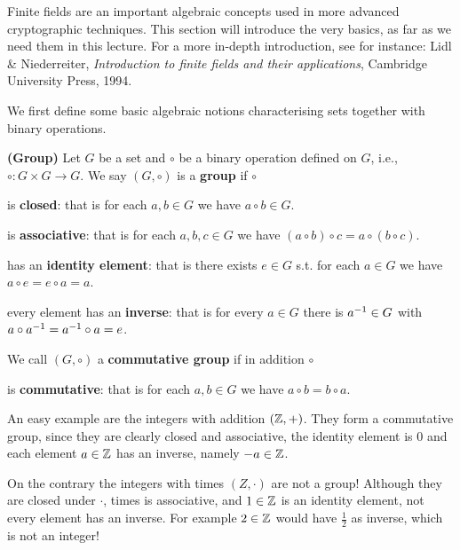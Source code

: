 \ifMaths{}

Finite fields are an important algebraic concepts used in more advanced
cryptographic techniques. This section will introduce the very basics, as far as
we need them in this lecture. For a more in-depth introduction, see for instance:
Lidl \& Niederreiter, \emph{Introduction to finite fields and their
  applications}, Cambridge University Press, 1994.

We first define some basic algebraic notions characterising sets together with
binary operations.

\begin{definition}{\textbf{(Group)}}  
  Let $G$ be a set and $\circ$ be a binary operation defined on $G$, i.e.,
  $\circ:G\times G\to G$. We say $(G,\circ)$ is a \textbf{group} if $\circ$
  \begin{romanenum}
  \item is \textbf{closed}: that is for each $a,b\in G$ we have $a\circ b\in G$.
  \item is \textbf{associative}: that is for each $a,b,c\in G$ we have $(a\circ
    b)\circ c=a\circ (b\circ c)$.
  \item has an \textbf{identity element}: that is there exists $e\in G$ s.t. for
    each $a\in G$ we have $a\circ e=e\circ a=a$.
  \item every element has an \textbf{inverse}: that is for every $a\in G$ there
    is ${{a}^{-1}}\in G$ with $a\circ{{a}^{-1}}={{a}^{-1}}\circ a=e$.
  \end{romanenum}
  We call $(G,\circ)$ a \textbf{commutative group} if in addition $\circ$
  \begin{romanenum}\addtocounter{enumi}{4}
  \item is \textbf{commutative}: that is for each $a,b\in G$ we have $a\circ b=b
    \circ a$.
  \end{romanenum}
\end{definition}

\example An easy example are the integers with addition $(\mathbb{Z},+)$. They form a
commutative group, since they are clearly closed and associative, the identity
element is $0$ and each element $a\in\mathbb{Z}$ has an inverse, namely $-a\in\mathbb{Z}$.

On the contrary the integers with times $(Z,\cdot)$ are not a group! Although
they are closed under $\cdot$, times is associative, and $1\in\mathbb{Z}$ is an identity
element, not every element has an inverse. For example $2\in\mathbb{Z}$ would have
$\frac12$ as inverse, which is not an integer!

